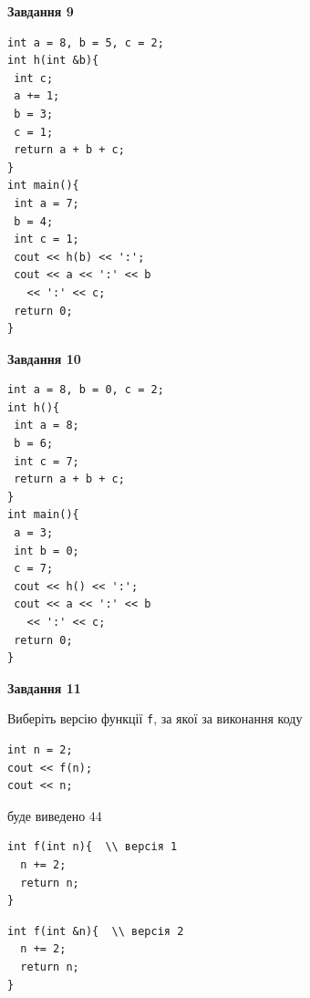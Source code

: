\documentclass[12pt, ukrainian]{article}
\def\code#1{\Verb!#1!}
\begin{document}
{\begin {large}
\begin{minipage}[t]{11.0cm}
\end{minipage}


\begin{minipage}[t]{7.0cm}

\begin{center}
\textbf{Завдання 9}
\end{center}
\vspace{-8mm}

\begin{verbatim}
int a = 8, b = 5, c = 2;
int h(int &b){
 int c;
 a += 1;
 b = 3;
 c = 1;
 return a + b + c;
}
int main(){
 int a = 7;
 b = 4;
 int c = 1;
 cout << h(b) << ':';
 cout << a << ':' << b 
   << ':' << c;
 return 0;
}
\end{verbatim}



\begin{center}
\textbf{Завдання 10}
\end{center}
\vspace{-8mm}

\begin{verbatim}
int a = 8, b = 0, c = 2;
int h(){
 int a = 8;
 b = 6;
 int c = 7;
 return a + b + c;
}
int main(){
 a = 3;
 int b = 0;
 c = 7;
 cout << h() << ':';
 cout << a << ':' << b 
   << ':' << c;
 return 0;
}
\end{verbatim}

\end{minipage}
\vline \hspace{1mm}
\begin{minipage}[t]{11.0cm}

\begin{center}
\textbf{Завдання 11}
\end{center}
Виберіть версію функції \code{f}, за якої за виконання коду
\begin{verbatim}
int n = 2;
cout << f(n);
cout << n;
\end{verbatim}

буде виведено 44

\begin{verbatim}
int f(int n){  \\ версія 1
  n += 2;
  return n;
}
\end{verbatim}

\vspace{-8mm}\begin{verbatim}
int f(int &n){  \\ версія 2
  n += 2;
  return n;
}
\end{verbatim}


\end{minipage}
\end{large}}
\end{document}
